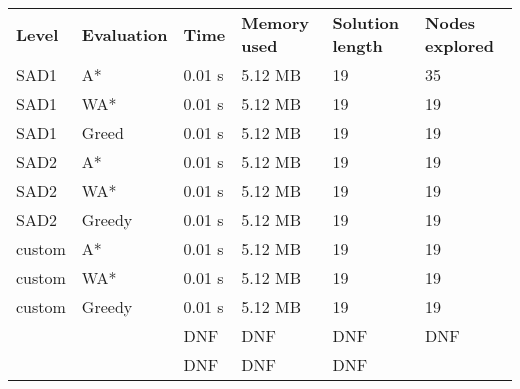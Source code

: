 




\begin{table}[h]
\begin{tabular}{llllll}
\rowcolor[HTML]{EFEFEF} 
\textbf{Level} & \textbf{Evaluation} & \textbf{Time} & \textbf{Memory used} & \textbf{Solution length} & \textbf{Nodes explored} \\
SAD1           & A*                  & 0.01 s        & 5.12 MB              & 19                       & 35                      \\
SAD1           & WA*                 & 0.01 s        & 5.12 MB              & 19                       & 19                      \\
SAD1           & Greed               & 0.01 s        & 5.12 MB              & 19                       & 19                      \\
SAD2           & A*                  & 0.01 s        & 5.12 MB              & 19                       & 19                      \\
SAD2           & WA*                 & 0.01 s        & 5.12 MB              & 19                       & 19                      \\
SAD2           & Greedy              & 0.01 s        & 5.12 MB              & 19                       & 19                      \\
custom         & A*                  & 0.01 s        & 5.12 MB              & 19                       & 19                      \\
custom         & WA*                 & 0.01 s        & 5.12 MB              & 19                       & 19                      \\
custom         & Greedy              & 0.01 s        & 5.12 MB              & 19                       & 19                      \\
               &                     & DNF           & DNF                  & DNF                      & DNF                     \\
               &                     & DNF           & DNF                  & DNF                      &                        
\end{tabular}
\end{table}

